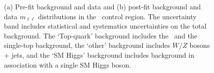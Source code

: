 \begin{figure}[htbp]
\centering

\caption{(a) Pre-fit background and data and (b) post-fit background and data $m_{\ell\ell}$ 
distributions in the \ZHF\ control region. 
The uncertainty band includes statistical 
and systematics uncertainties on the total background.
The  `Top-quark' background includes the \ttbar\ and the single-top background, 
the `other' background includes $W$/$Z$ bosons + jets, and the `SM Higgs' background
includes background in association with a single SM Higgs boson. }
\label{fig:DiHiggs:zcr}
\end{figure}
